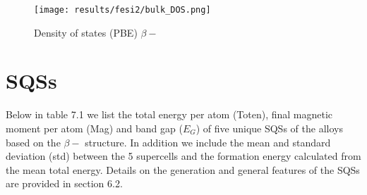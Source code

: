 \begin{figure}[H]
\centering
\texttt{[image: results/fesi2/bulk\_DOS.png]}
\caption{Density of states (PBE) $\beta-$ }
\end{figure}
 

\section{ SQSs}
Below in table 7.1 we list the total energy per atom (Toten), final magnetic moment per atom (Mag) and band gap ($E_G$) of five unique SQSs of the  alloys based on the $\beta-$  structure. In addition we include the mean and standard deviation (std) between the 5 supercells and the formation energy calculated from the mean total energy. Details on the generation and general features of the SQSs are provided in section 6.2. 
 
